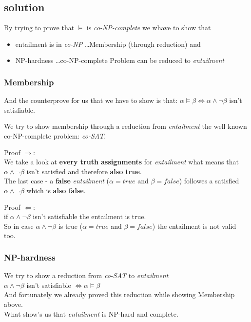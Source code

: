 \subsection{solution}

By trying to prove that $\vDash$ is \textit{co-NP-complete} we whave to show that
\begin{itemize}
 \item entailment is in \textit{co-NP} \dots Membership (through reduction) and
 \item NP-hardness \dots co-NP-complete Problem can be reduced to \textit{entailment}
\end{itemize}

\subsubsection{Membership}
And the counterprove for us that we have to show is that:
$\alpha \vDash \beta \iff \alpha \wedge \neg\beta$ isn't satisfiable.

We try to show membership through a reduction from \textit{entailment} the well known 
co-NP-complete problem: \textit{co-SAT}.\newline

\noindent Proof $\Rightarrow$:\\
We take a look at \textbf{every truth assignments} for \textit{entailment} what means 
that $\alpha \wedge \neg\beta$ isn't satisfied and therefore \textbf{also true}. \\
The last case - a \textbf{false} \textit{entailment} ($\alpha = true$ and $\beta = false$) 
followes a satisfied $\alpha \wedge \neg\beta$ which is \textbf{also false}.

\noindent Proof $\Leftarrow$:\\
if $\alpha \wedge \neg\beta$ isn't satisfiable the entailment is true.\\
So in case $\alpha \wedge \neg\beta$ is true ($\alpha = true$ and $\beta = false$)
the entailment is not valid too.

\subsubsection{NP-hardness}
We try to show a reduction from \textit{co-SAT} to \textit{entailment}\\

$\alpha \wedge \neg\beta$ isn't satisfiable $\iff \alpha \vDash \beta$\\
And fortunately we already proved this reduction while showing Membership above.\\

What show's us that \textit{entailment} is NP-hard and complete.